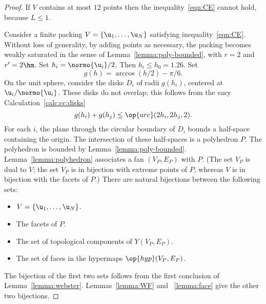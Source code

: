 \begin{proof} If $ V$ contains at most $12$  points then
the inequality~\ref{eqn:CE} cannot hold, because $L\le 1$.

Consider a finite packing $ V=\{\u_1,\ldots, \u_N\}$ satisfying
inequality~\ref{eqn:CE}.  Without loss of generality, by adding points
as necessary, the packing becomes weakly saturated in the sense of
Lemma~\ref{lemma:poly-bounded}, with $r=2$ and $r'=2\hm$.  Set $h_i =
\normo{ \u_i}/2$.  Then $h_i\le h_0=1.26$.  Set
\begin{displaymath}%
g(h) = \arccos(h/2) - \pi/6.  %
\end{displaymath}%
On the unit sphere, consider the disks $D_i$ of radii $g(h_i)$,
centered at $ \u_i/\normo{ \u_i}$.  These disks do not overlap; this
follows from the easy
Calculation~\ref{calc:cc:disks} %
\begin{equation}\label{eqn:disks} 
g(h_i) + g(h_j) \le \op{arc}(2h_i,2h_j,2).%
\end{equation}%
%
For each $i$, the plane through the circular boundary of $D_i$ bounds
a half-space containing the origin.  The intersection of these
half-spaces is a polyhedron $P$.  The polyhedron is bounded by
Lemma~\ref{lemma:poly-bounded}.  Lemma~\ref{lemma:polyhedron}
associates a fan $(V_P,E_P)$ with $P$.  (The set $V_P$ is dual to $
V$; the set $V_P$ is in bijection with extreme points of $P$, whereas $
V$ is in bijection with the facets of $P$.)  There are natural
bijections between the following sets:
\begin{itemize} 
\item $ V = \{ \u_1,\ldots, \u_N\}$.
\item The  facets of $P$.
\item The set of  topological components of $Y(V_P,E_P)$.
\item The set of faces in the hypermaps $\op{hyp}(V_P,E_P)$.
\end{itemize}
The bijection of the first two sets follows from the first conclusion
of Lemma~\ref{lemma:webster}.  Lemmas~\ref{lemma:WF} and
~\ref{lemma:face} give the other two bijections.


\end{proof}
